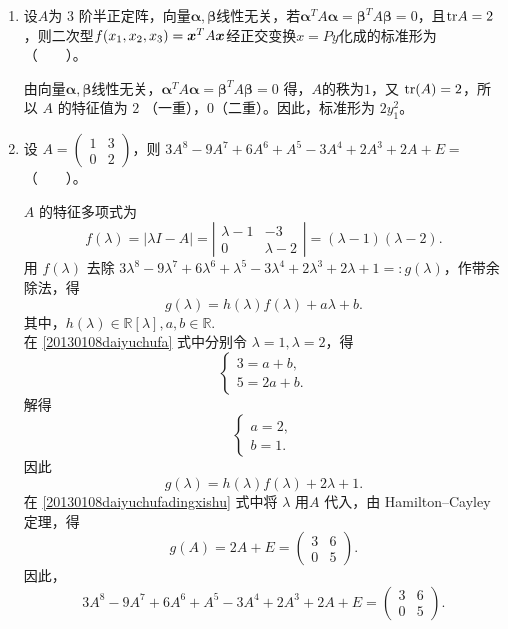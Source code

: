 \begin{enumerate}[1~]
\begin{enumerate}[1.~]
\item
设$A$为 $3$ 阶半正定阵，向量$\boldsymbol{\alpha}, \boldsymbol{\beta}$线性无关，若$\boldsymbol{\alpha}^T A \boldsymbol{\alpha} = \boldsymbol{\beta}^T A \boldsymbol{\beta} = 0$，且${\rm tr} A = 2$，则二次型$f(x_1, x_2, x_3) = \boldsymbol{x}^TA\boldsymbol{x}$经正交变换$x = Py$化成的标准形为 （\ \ \ \ ）。
\begin{solution}
由向量$\boldsymbol{\alpha}, \boldsymbol{\beta}$线性无关，$\boldsymbol{\alpha} ^TA\boldsymbol{\alpha} =\boldsymbol{\beta} ^TA\boldsymbol{\beta} =0$ 得，$A\text{的秩为}1$，又 ${\rm tr}(A)=2$，所以 $A$ 的特征值为 $2$ （一重），$0$（二重）。因此，标准形为 $2y_1^2$。
\end{solution}

\item
设 $A = \left( \begin{smallmatrix}
1&  3\\
0&  2
\end{smallmatrix} \right)$，则 $3A^8-9A^7+6A^6+A^5-3A^4+2A^3+2A+E =$ （\ \ \ \ ）。
\begin{solution}
$A$ 的特征多项式为\[
f(\lambda) = |\lambda I -A| = \left| \begin{matrix}
\lambda-1&  -3\\
0&  \lambda-2
\end{matrix} \right| = (\lambda-1)(\lambda-2). \]
用 $f(\lambda)$ 去除 $3 \lambda^8 -9 \lambda^7 +6 \lambda^6 +\lambda^5 - 3\lambda^4 +2\lambda^3 +2\lambda +1 =: g(\lambda)$，作带余除法，得\begin{equation} \label{20130108daiyuchufa}
g(\lambda) = h(\lambda) f(\lambda) +a \lambda +b. 
\end{equation}
其中，$h(\lambda) \in \mathbb{R}[\lambda], a,b \in \mathbb{R}.$\\
在  \eqref{20130108daiyuchufa} 式中分别令 $\lambda=1 ,\lambda =2$，得\[
\left\{ \begin{array}{l}
3 = a+b,\\
5 = 2a+b. \end{array}\right.
\]
解得 \[
\left\{ \begin{array}{l}
a =2,\\
b =1. \end{array}\right.
\]
因此 \begin{equation} \label{20130108daiyuchufadingxishu}
g(\lambda) = h(\lambda) f(\lambda) +2\lambda +1.
\end{equation}
在  \eqref{20130108daiyuchufadingxishu} 式中将 $\lambda$ 用$A$ 代入，由 Hamilton--Cayley 定理，得\[
g(A)  = 2A+E =\left( \begin{matrix}
3&  6\\
0&  5 
\end{matrix} \right). \]
因此，\[
3 A^8 -9 A^7 +6 A^6 +A^5 - 3A^4 +2A^3 +2A+E = \left( \begin{matrix}
3&  6\\
0&  5 
\end{matrix} \right). \]
\end{solution}


\end{enumerate}
\end{enumerate}
